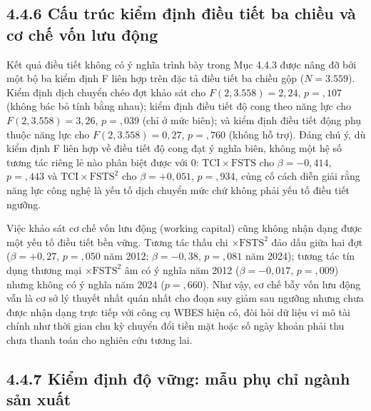 \documentclass[
  a4paper,
  13pt]{extreport}
\begin{document}
\hypertarget{cux1ea5u-truxfac-kiux1ec3m-ux111ux1ecbnh-ux111iux1ec1u-tiux1ebft-ba-chiux1ec1u-vuxe0-cux1a1-chux1ebf-vux1ed1n-lux1b0u-ux111ux1ed9ng}{%
\subsection{4.4.6 Cấu trúc kiểm định điều tiết ba chiều và cơ chế vốn
lưu
động}\label{cux1ea5u-truxfac-kiux1ec3m-ux111ux1ecbnh-ux111iux1ec1u-tiux1ebft-ba-chiux1ec1u-vuxe0-cux1a1-chux1ebf-vux1ed1n-lux1b0u-ux111ux1ed9ng}}

Kết quả điều tiết không có ý nghĩa trình bày trong Mục 4.4.3 được nâng
đỡ bởi một bộ ba kiểm định F liên hợp trên đặc tả điều tiết ba chiều gộp
(\(N = 3.559\)). Kiểm định dịch chuyển chéo đợt khảo sát cho
\(F(2, 3.558) = 2{,}24\), \(p = {,}107\) (không bác bỏ tính bằng nhau);
kiểm định điều tiết độ cong theo năng lực cho \(F(2, 3.558) = 3{,}26\),
\(p = {,}039\) (chỉ ở mức biên); và kiểm định điều tiết động phụ thuộc
năng lực cho \(F(2, 3.558) = 0{,}27\), \(p = {,}760\) (không hỗ trợ).
Đáng chú ý, dù kiểm định F liên hợp về điều tiết độ cong đạt ý nghĩa
biên, không một hệ số tương tác riêng lẻ nào phân biệt được với 0:
\(\text{TCI} \times \mathrm{FSTS}\) cho \(\beta = -0{,}414\),
\(p = {,}443\) và \(\text{TCI} \times \mathrm{FSTS}^2\) cho
\(\beta = +0{,}051\), \(p = {,}934\), củng cố cách diễn giải rằng năng
lực công nghệ là yếu tố dịch chuyển mức chứ không phải yếu tố điều tiết
ngưỡng.

Việc khảo sát cơ chế vốn lưu động (working capital) cũng không nhận dạng
được một yếu tố điều tiết bền vững. Tương tác thấu chi
\(\times \mathrm{FSTS}^2\) đảo dấu giữa hai đợt (\(\beta = +0{,}27\),
\(p = {,}050\) năm 2012; \(\beta = -0{,}38\), \(p = {,}081\) năm 2024);
tương tác tín dụng thương mại \(\times \mathrm{FSTS}^2\) âm có ý nghĩa
năm 2012 (\(\beta = -0{,}017\), \(p = {,}009\)) nhưng không có ý nghĩa
năm 2024 (\(p = {,}660\)). Như vậy, cơ chế bẫy vốn lưu động vẫn là cơ sở
lý thuyết nhất quán nhất cho đoạn suy giảm sau ngưỡng nhưng chưa được
nhận dạng trực tiếp với công cụ WBES hiện có, đòi hỏi dữ liệu vi mô tài
chính như thời gian chu kỳ chuyển đổi tiền mặt hoặc số ngày khoản phải
thu chưa thanh toán cho nghiên cứu tương lai.

\hypertarget{kiux1ec3m-ux111ux1ecbnh-ux111ux1ed9-vux1eefng-mux1eabu-phux1ee5-chux1ec9-nguxe0nh-sux1ea3n-xuux1ea5t}{%
\subsection{4.4.7 Kiểm định độ vững: mẫu phụ chỉ ngành sản
xuất}\label{kiux1ec3m-ux111ux1ecbnh-ux111ux1ed9-vux1eefng-mux1eabu-phux1ee5-chux1ec9-nguxe0nh-sux1ea3n-xuux1ea5t}}
\end{document}

